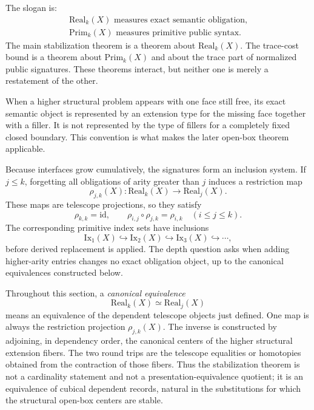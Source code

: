 \documentclass{lmcs}
\begin{document}
The slogan is:
\[
  \begin{gathered}
  \mathrm{Real}_k(X) \text{ measures exact semantic obligation,}\\
  \mathrm{Prim}_k(X) \text{ measures primitive public syntax.}
  \end{gathered}
\]
The main stabilization theorem is a theorem about \(\mathrm{Real}_k(X)\).  The trace-cost
bound is a theorem about \(\mathrm{Prim}_k(X)\) and about the trace part of normalized public
signatures.  These theorems interact, but neither one is merely a restatement of the other.

When a higher structural problem appears with one face still free, its exact semantic object
is represented by an extension type for the missing face together with a filler.  It is not
represented by the type of fillers for a completely fixed closed boundary.  This convention is
what makes the later open-box theorem applicable.

Because interfaces grow cumulatively, the signatures form an inclusion system.  If \(j\leq k\),
forgetting all obligations of arity greater than \(j\) induces a restriction map
\[
  \rho_{j,k}(X):\mathrm{Real}_k(X)\longrightarrow \mathrm{Real}_j(X).
\]
These maps are telescope projections, so they satisfy
\[
  \rho_{k,k}=\mathrm{id},
  \qquad
  \rho_{i,j}\circ\rho_{j,k}=\rho_{i,k}
  \quad (i\leq j\leq k).
\]
The corresponding primitive index sets have inclusions
\[
  \mathrm{Ix}_1(X)\hookrightarrow \mathrm{Ix}_2(X)\hookrightarrow
  \mathrm{Ix}_3(X)\hookrightarrow\cdots,
\]
before derived replacement is applied.  The depth question asks when adding higher-arity
entries changes no exact obligation object, up to the canonical equivalences constructed
below.

Throughout this section, a \emph{canonical equivalence}
\[
  \mathrm{Real}_k(X)\simeq \mathrm{Real}_j(X)
\]
means an equivalence of the dependent telescope objects just defined.  One map is always the
restriction projection \(\rho_{j,k}(X)\).  The inverse is constructed by adjoining, in
dependency order, the canonical centers of the higher structural extension fibers.  The two
round trips are the telescope equalities or homotopies obtained from the contraction of those
fibers.  Thus the stabilization theorem is not a cardinality statement and not a
presentation-equivalence quotient; it is an equivalence of cubical dependent records, natural
in the substitutions for which the structural open-box centers are stable.
\end{document}
